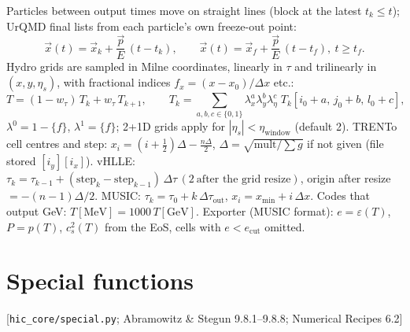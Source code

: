 \documentclass[11pt,a4paper]{article}
\newcommand{\file}[1]{\texttt{\small #1}}
\newcommand{\src}[1]{\hfill{\small\color{gray}[#1]}}
\begin{document}
Particles between output times move on straight lines (block at the latest $t_k\le t$); UrQMD final lists from each
particle's own freeze-out point:
\begin{equation}
\vec x(t) = \vec x_k + \frac{\vec p}{E}\,(t-t_k),\qquad \vec x(t) = \vec x_f + \frac{\vec p}{E}\,(t-t_f),\ t\ge t_f .
\end{equation}
Hydro grids are sampled in Milne coordinates, linearly in $\tau$ and trilinearly in $(x,y,\eta_s)$, with fractional
indices $f_x = (x-x_0)/\Delta x$ etc.:
\begin{equation}
T = (1-w_\tau)\,T_k + w_\tau\,T_{k+1},\qquad
T_k = \sum_{a,b,c\in\{0,1\}} \lambda_x^{a}\lambda_y^{b}\lambda_\eta^{c}\;T_k[i_0+a,\,j_0+b,\,l_0+c],
\end{equation}
$\lambda^0 = 1-\{f\}$, $\lambda^1 = \{f\}$; 2+1D grids apply for $|\eta_s|<\eta_\text{window}$ (default 2).
TRENTo cell centres and step: $x_i = (i+\tfrac12)\Delta - \tfrac{n\Delta}{2}$, $\Delta = \sqrt{\text{mult}/\sum g}$ if
not given (file stored $[i_y][i_x]$).
vHLLE: $\tau_k = \tau_{k-1} + (\text{step}_k-\text{step}_{k-1})\,\Delta\tau\,(2~\text{after the grid resize})$,
origin after resize $=-(n-1)\Delta/2$. MUSIC: $\tau_k=\tau_0+k\,\Delta\tau_\text{out}$, $x_i = x_\text{min}+i\,\Delta x$.
Codes that output GeV: $T[\text{MeV}] = 1000\,T[\text{GeV}]$. Exporter (MUSIC format): $e=\varepsilon(T)$, $P=p(T)$,
$c_s^2(T)$ from the EoS, cells with $e<e_\text{cut}$ omitted.

\section{Special functions}\label{sec:special}
\src{\file{hic\_core/special.py}; Abramowitz \& Stegun 9.8.1--9.8.8; Numerical Recipes 6.2}
\end{document}
